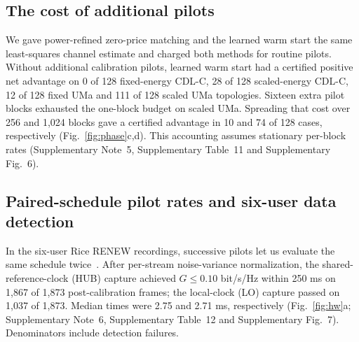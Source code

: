\subsection*{The cost of additional pilots}
We gave power-refined zero-price matching and the learned warm start the same least-squares channel estimate and charged both methods for routine pilots. Without additional calibration pilots, learned warm start had a certified positive net advantage on 0 of 128 fixed-energy CDL-C, 28 of 128 scaled-energy CDL-C, 12 of 128 fixed UMa and 111 of 128 scaled UMa topologies. Sixteen extra pilot blocks exhausted the one-block budget on scaled UMa. Spreading that cost over 256 and 1,024 blocks gave a certified advantage in 10 and 74 of 128 cases, respectively (Fig.~\ref{fig:phase}c,d). This accounting assumes stationary per-block rates (Supplementary Note~5, Supplementary Table~11 and Supplementary Fig.~6).


\subsection*{Paired-schedule pilot rates and six-user data detection}
In the six-user Rice RENEW recordings, successive pilots let us evaluate the same schedule twice~\cite{zafari,renew}. After per-stream noise-variance normalization, the shared-reference-clock (HUB) capture achieved \(G\leq0.10\) bit/s/Hz within 250 ms on 1,867 of 1,873 post-calibration frames; the local-clock (LO) capture passed on 1,037 of 1,873. Median times were 2.75 and 2.71 ms, respectively (Fig.~\ref{fig:hw}a; Supplementary Note~6, Supplementary Table~12 and Supplementary Fig.~7). Denominators include detection failures.

